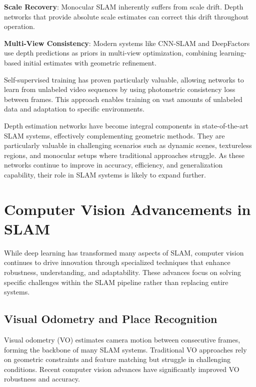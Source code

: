 \documentclass[12pt]{article}
\begin{document}
    \textbf{Scale Recovery}: Monocular SLAM inherently suffers from scale drift. Depth networks that provide absolute scale estimates can correct this drift throughout operation.
    
    \textbf{Multi-View Consistency}: Modern systems like CNN-SLAM and DeepFactors \cite{deepfactors} use depth predictions as priors in multi-view optimization, combining learning-based initial estimates with geometric refinement.
        
    Self-supervised training has proven particularly valuable, allowing networks to learn from unlabeled video sequences by using photometric consistency loss between frames. This approach enables training on vast amounts of unlabeled 
    data and adaptation to specific environments.
        
    Depth estimation networks have become integral components in state-of-the-art SLAM systems, effectively complementing geometric methods. They are particularly valuable in challenging scenarios such as dynamic scenes, textureless regions, 
    and monocular setups where traditional approaches struggle. As these networks continue to improve in accuracy, efficiency, and generalization capability, their role in SLAM systems is likely to expand further.

    \section{Computer Vision Advancements in SLAM}

    While deep learning has transformed many aspects of SLAM, computer vision continues to drive innovation through specialized techniques that enhance robustness, understanding, and adaptability. These advances focus on solving specific 
    challenges within the SLAM pipeline rather than replacing entire systems.
    
    \subsection{Visual Odometry and Place Recognition}
    
    Visual odometry (VO) estimates camera motion between consecutive frames, forming the backbone of many SLAM systems. Traditional VO approaches rely on geometric constraints and feature matching but struggle in challenging conditions. 
    Recent computer vision advances have significantly improved VO robustness and accuracy.
    
\end{document}
